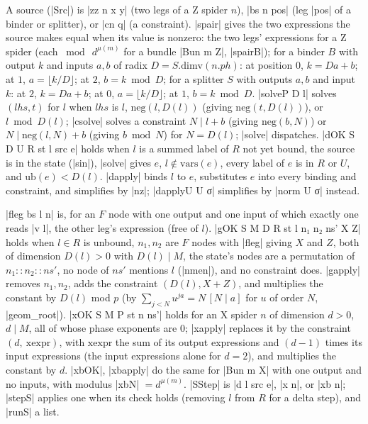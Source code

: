 \begin{definition}\label{def:lean-core-dstep}
A source (\lean|Src|) is \lean|zz n x y| (two legs of a Z spider $n$), \lean|bs n pos| (leg \lean|pos| of a binder or splitter), or \lean|cn q| (a constraint). \lean|spair| gives the two expressions the source makes equal when its value is nonzero: the two legs' expressions for a Z spider (each $\bmod\ d^{\mu(m)}$ for a bundle \lean|Bun m Z|, \lean|spairB|); for a binder $B$ with output $k$ and inputs $a,b$ of radix $D=S.\mathrm{dimv}(n.ph)$: at position $0$, $k=Da+b$; at $1$, $a=\lfloor k/D\rfloor$; at $2$, $b=k\bmod D$; for a splitter $S$ with outputs $a,b$ and input $k$: at $2$, $k=Da+b$; at $0$, $a=\lfloor k/D\rfloor$; at $1$, $b=k\bmod D$. \lean|solveP D l| solves $(\mathit{lhs},t)$ for $l$ when $\mathit{lhs}$ is $l$, $\mathrm{neg}(l,D(l))$ (giving $\mathrm{neg}(t,D(l))$), or $l\bmod D(l)$; \lean|csolve| solves a constraint $N\mid l+b$ (giving $\mathrm{neg}(b,N)$) or $N\mid\mathrm{neg}(l,N)+b$ (giving $b\bmod N$) for $N=D(l)$; \lean|solve| dispatches. \lean|dOK S D U R st l src e| holds when $l$ is a summed label of $R$ not yet bound, the source is in the state (\lean|sin|), \lean|solve| gives $e$, $l\notin\mathrm{vars}(e)$, every label of $e$ is in $R$ or $U$, and $\mathrm{ub}(e)<D(l)$. \lean|dapply| binds $l$ to $e$, substitutes $e$ into every binding and constraint, and simplifies by \lean|nz|; \lean|dapplyU U σ| simplifies by \lean|norm U σ| instead.
\end{definition}

\begin{definition}\label{def:lean-core-gstep}
\lean|fleg bs l n| is, for an $F$ node with one output and one input of which exactly one reads \lean|v l|, the other leg's expression (free of $l$). \lean|gOK S M D R st l n₁ n₂ ns' X Z| holds when $l\in R$ is unbound, $n_1,n_2$ are $F$ nodes with \lean|fleg| giving $X$ and $Z$, both of dimension $D(l)>0$ with $D(l)\mid M$, the state's nodes are a permutation of $n_1::n_2::ns'$, no node of $ns'$ mentions $l$ (\lean|nmen|), and no constraint does. \lean|gapply| removes $n_1,n_2$, adds the constraint $(D(l),X+Z)$, and multiplies the constant by $D(l)$ mod $p$ (by $\sum_{j<N}u^{ja}=N\,[N\mid a]$ for $u$ of order $N$, \lean|geom_root|). \lean|xOK S M P st n ns'| holds for an X spider $n$ of dimension $d>0$, $d\mid M$, all of whose phase exponents are $0$; \lean|xapply| replaces it by the constraint $(d,\ \mathrm{xexpr})$, with $\mathrm{xexpr}$ the sum of its output expressions and $(d-1)$ times its input expressions (the input expressions alone for $d=2$), and multiplies the constant by $d$. \lean|xbOK|, \lean|xbapply| do the same for \lean|Bun m X| with one output and no inputs, with modulus \lean|xbN| $=d^{\mu(m)}$. \lean|SStep| is \lean|d l src e|, \lean|x n|, or \lean|xb n|; \lean|stepS| applies one when its check holds (removing $l$ from $R$ for a delta step), and \lean|runS| a list.
\end{definition}

